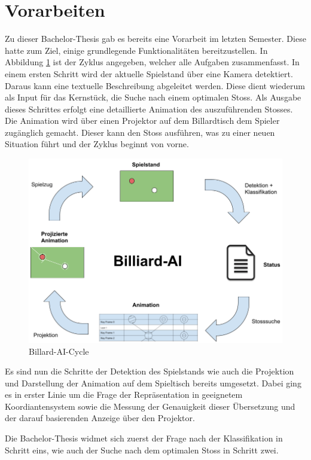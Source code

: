 \section{Vorarbeiten}
Zu dieser Bachelor-Thesis gab es bereits eine Vorarbeit im letzten Semester. Diese hatte zum Ziel, einige
grundlegende Funktionalitäten bereitzustellen. In Abbildung \ref{fig:billiard_ai_cycle} ist der Zyklus angegeben,
welcher alle Aufgaben zusammenfasst. In einem ersten Schritt wird der aktuelle Spielstand über eine Kamera detektiert.
Daraus kann eine textuelle Beschreibung abgeleitet werden. Diese dient wiederum als Input für das Kernstück, die Suche
nach einem optimalen Stoss. Als Ausgabe dieses Schrittes erfolgt eine detaillierte Animation des auszuführenden Stosses.
Die Animation wird über einen Projektor auf dem Billardtisch dem Spieler zugänglich gemacht. Dieser kann den Stoss ausführen,
was zu einer neuen Situation führt und der Zyklus beginnt von vorne.

\begin{figure}[h!]
    \begin{center}
        \includegraphics[width=0.8\linewidth]{../common/03_billiard_ai/resources/19_billiard_ai_cycle.png}
    \end{center}
    \caption{Billard-AI-Cycle}
    \label{fig:billiard_ai_cycle}
\end{figure}

Es sind nun die Schritte der Detektion des Spielstands wie auch die Projektion und Darstellung der Animation auf dem
Spieltisch bereits umgesetzt. Dabei ging es in erster Linie um die Frage der Repräsentation in geeignetem Koordiantensystem
sowie die Messung der Genauigkeit dieser Übersetzung und der darauf basierenden Anzeige über den Projektor.

Die Bachelor-Thesis widmet sich zuerst der Frage nach der Klassifikation in Schritt eins, wie auch der Suche
nach dem optimalen Stoss in Schritt zwei.